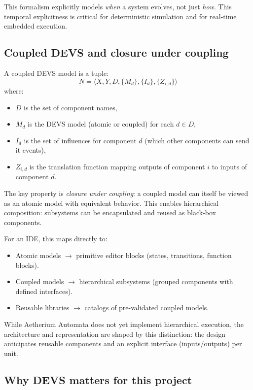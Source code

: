 This formalism explicitly models \emph{when} a system evolves, not just \emph{how}.
This temporal explicitness is critical for deterministic simulation and for real-time embedded execution.

\subsection{Coupled DEVS and closure under coupling}

A coupled DEVS model is a tuple:
\[
N = \langle X, Y, D, \{M_d\}, \{I_d\}, \{Z_{i,d}\} \rangle
\]
where:
\begin{itemize}
  \item $D$ is the set of component names,
  \item $M_d$ is the DEVS model (atomic or coupled) for each $d \in D$,
  \item $I_d$ is the set of influences for component $d$ (which other components can send it events),
  \item $Z_{i,d}$ is the translation function mapping outputs of component $i$ to inputs of component $d$.
\end{itemize}


The key property is \emph{closure under coupling}: a coupled model can itself be viewed as an atomic model with equivalent behavior.
This enables hierarchical composition: subsystems can be encapsulated and reused as black-box components.

For an IDE, this maps directly to:
\begin{itemize}
  \item Atomic models $\rightarrow$ primitive editor blocks (states, transitions, function blocks).
  \item Coupled models $\rightarrow$ hierarchical subsystems (grouped components with defined interfaces).
  \item Reusable libraries $\rightarrow$ catalogs of pre-validated coupled models.
\end{itemize}

While Aetherium Automata does not yet implement hierarchical execution, the architecture and representation are shaped by this distinction: the design anticipates reusable components and an explicit interface (inputs/outputs) per unit.

\subsection{Why DEVS matters for this project}


